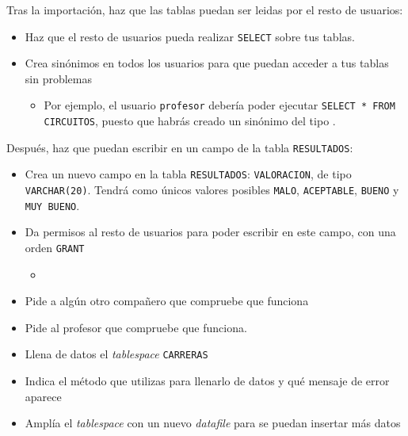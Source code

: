 \begin{homeworkProblem}
  Tras la importación, haz que las tablas puedan ser leidas por el resto de usuarios:
  \begin{itemize}
  \item Haz que el resto de usuarios pueda realizar \texttt{SELECT} sobre tus tablas.  
  \item Crea sinónimos en todos los usuarios para que puedan acceder a tus tablas sin problemas
    \begin{itemize}
    \item Por ejemplo, el usuario \texttt{profesor} debería poder ejecutar \texttt{SELECT * FROM CIRCUITOS}, puesto que habrás creado un sinónimo del tipo .
    \end{itemize}
  \end{itemize}

  Después, haz que puedan escribir en un campo de la tabla \texttt{RESULTADOS}:
  \begin{itemize}
  \item Crea un nuevo campo en la tabla \texttt{RESULTADOS}: \texttt{VALORACION}, de tipo \texttt{VARCHAR(20)}. Tendrá como únicos valores posibles \texttt{MALO}, \texttt{ACEPTABLE}, \texttt{BUENO} y \texttt{MUY BUENO}.
    
  \item Da permisos al resto de usuarios para poder escribir en este campo, con una orden \texttt{GRANT}
    \begin{itemize}
    \item {}
    \end{itemize}

  \item Pide a algún otro compañero que compruebe que funciona
  \item Pide al profesor que compruebe que funciona.

  \end{itemize}
  

\end{homeworkProblem}

\begin{homeworkProblem}
  \begin{itemize}
  \item Llena de datos el \textit{tablespace} \texttt{CARRERAS}
  \item Indica el método que utilizas para llenarlo de datos y qué mensaje de error aparece
  \item Amplía el \textit{tablespace}  con un nuevo \textit{datafile} para se puedan insertar más datos
  \end{itemize}
\end{homeworkProblem}

